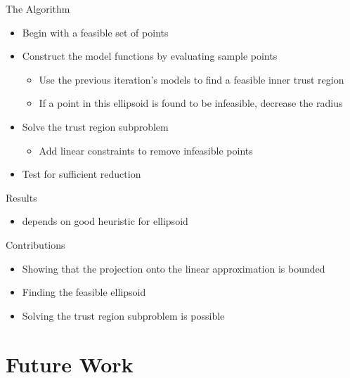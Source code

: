 \documentclass{beamer}
\begin{document}
\begin{frame}{The Algorithm}
    \begin{itemize}
        \item Begin with a feasible set of points
        \item Construct the model functions by evaluating sample points
            \begin{itemize}
                \item Use the previous iteration's models to find a feasible inner trust region
                \item If a point in this ellipsoid is found to be infeasible, decrease the radius
            \end{itemize}
        \item Solve the trust region subproblem
            \begin{itemize}
                \item Add linear constraints to remove infeasible points
            \end{itemize}
        \item Test for sufficient reduction
    \end{itemize}
\end{frame}


\begin{frame}{Results}
	\begin{itemize}
		\item depends on good heuristic for ellipsoid
	\end{itemize}
\end{frame}


\begin{frame}{Contributions}
	\begin{itemize}
		\item Showing that the projection onto the linear approximation is bounded
		\item Finding the feasible ellipsoid
		\item Solving the trust region subproblem is possible
	\end{itemize}
\end{frame}

\section{Future Work}


\end{document}
